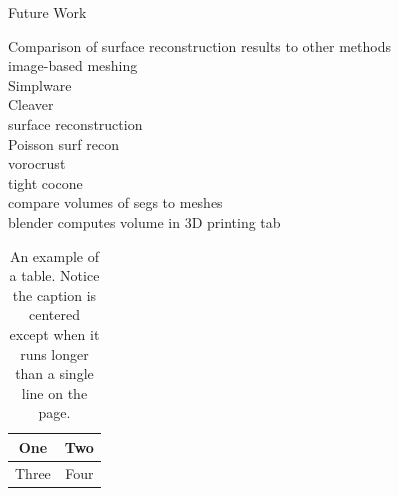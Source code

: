 Future Work

Comparison of surface reconstruction results to other methods \\
image-based meshing \\
Simplware \\
Cleaver \\
surface reconstruction \\
Poisson surf recon \\
vorocrust \\
tight cocone \\
compare volumes of segs to meshes \\
blender computes volume in 3D printing tab \\

\begin{table}[tbh]
\renewcommand{\arraystretch}{1.3}
\centering
\begin{tabular}{|c||c|}
\hline
One & Two\\
\hline
Three & Four\\
\hline
\end{tabular}
\caption[Example table]{An example of a table. Notice the caption is centered except when it runs longer than a single line on the page.}
\label{tab.example_1}
\end{table}